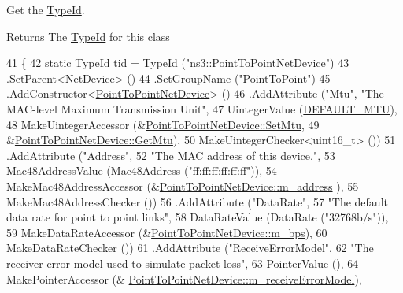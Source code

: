 Get the \hyperlink{classns3_1_1TypeId}{Type\+Id}. 

\begin{DoxyReturn}{Returns}
The \hyperlink{classns3_1_1TypeId}{Type\+Id} for this class 
\end{DoxyReturn}

\begin{DoxyCode}
41 \{
42   \textcolor{keyword}{static} TypeId tid = TypeId (\textcolor{stringliteral}{"ns3::PointToPointNetDevice"})
43     .SetParent<NetDevice> ()
44     .SetGroupName (\textcolor{stringliteral}{"PointToPoint"})
45     .AddConstructor<\hyperlink{classns3_1_1PointToPointNetDevice_a174d258b6dbfcac4b228ebcab9c49cf5}{PointToPointNetDevice}> ()
46     .AddAttribute (\textcolor{stringliteral}{"Mtu"}, \textcolor{stringliteral}{"The MAC-level Maximum Transmission Unit"},
47                    UintegerValue (\hyperlink{classns3_1_1PointToPointNetDevice_a053e12ea8d9014b856c64bd086a43f21}{DEFAULT\_MTU}),
48                    MakeUintegerAccessor (&\hyperlink{classns3_1_1PointToPointNetDevice_a32dc878b14e4b02361529db8414644f1}{PointToPointNetDevice::SetMtu},
49                                          &\hyperlink{classns3_1_1PointToPointNetDevice_a5bc86d4e92218363bd2eafa362c82095}{PointToPointNetDevice::GetMtu}),
50                    MakeUintegerChecker<uint16\_t> ())
51     .AddAttribute (\textcolor{stringliteral}{"Address"}, 
52                    \textcolor{stringliteral}{"The MAC address of this device."},
53                    Mac48AddressValue (Mac48Address (\textcolor{stringliteral}{"ff:ff:ff:ff:ff:ff"})),
54                    MakeMac48AddressAccessor (&\hyperlink{classns3_1_1PointToPointNetDevice_ab5e476570bb9311ca53a457fc987bdb8}{PointToPointNetDevice::m\_address}
      ),
55                    MakeMac48AddressChecker ())
56     .AddAttribute (\textcolor{stringliteral}{"DataRate"}, 
57                    \textcolor{stringliteral}{"The default data rate for point to point links"},
58                    DataRateValue (DataRate (\textcolor{stringliteral}{"32768b/s"})),
59                    MakeDataRateAccessor (&\hyperlink{classns3_1_1PointToPointNetDevice_a188a0f39b73b58cd7b61e008ad72d5f7}{PointToPointNetDevice::m\_bps}),
60                    MakeDataRateChecker ())
61     .AddAttribute (\textcolor{stringliteral}{"ReceiveErrorModel"}, 
62                    \textcolor{stringliteral}{"The receiver error model used to simulate packet loss"},
63                    PointerValue (),
64                    MakePointerAccessor (&
      \hyperlink{classns3_1_1PointToPointNetDevice_a685e60184c60bf96abc011081e1d589b}{PointToPointNetDevice::m\_receiveErrorModel}),

\end{DoxyCode}
